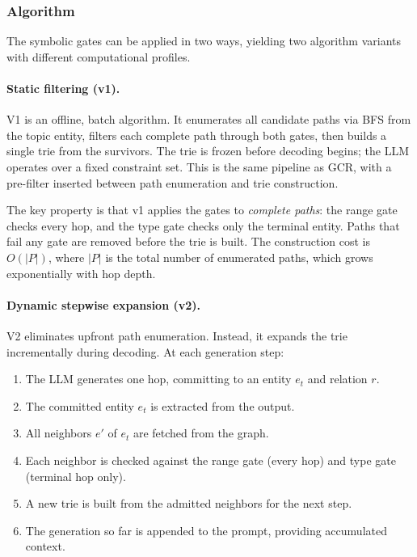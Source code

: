 \documentclass[11pt,twoside]{article}
\begin{document}
\subsubsection{Algorithm}

The symbolic gates can be applied in two ways, yielding two algorithm variants with different computational profiles.

\paragraph{Static filtering (v1).}
V1 is an offline, batch algorithm. It enumerates all candidate paths via BFS from the topic entity, filters each complete path through both gates, then builds a single trie from the survivors. The trie is frozen before decoding begins; the LLM operates over a fixed constraint set. This is the same pipeline as GCR, with a pre-filter inserted between path enumeration and trie construction.

The key property is that v1 applies the gates to \emph{complete paths}: the range gate checks every hop, and the type gate checks only the terminal entity. Paths that fail any gate are removed before the trie is built. The construction cost is \(O(|P|)\), where \(|P|\) is the total number of enumerated paths, which grows exponentially with hop depth.

\paragraph{Dynamic stepwise expansion (v2).}
V2 eliminates upfront path enumeration. Instead, it expands the trie incrementally during decoding. At each generation step:

\begin{enumerate}
	\item The LLM generates one hop, committing to an entity \(e_t\) and relation \(r\).
	\item The committed entity \(e_t\) is extracted from the output.
	\item All neighbors \(e'\) of \(e_t\) are fetched from the graph.
	\item Each neighbor is checked against the range gate (every hop) and type gate (terminal hop only).
	\item A new trie is built from the admitted neighbors for the next step.
	\item The generation so far is appended to the prompt, providing accumulated context.
\end{enumerate}
\end{document}
